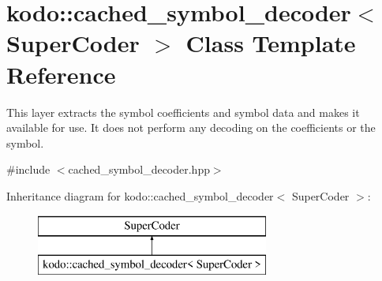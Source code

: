 \hypertarget{classkodo_1_1cached__symbol__decoder}{\section{kodo\-:\-:cached\-\_\-symbol\-\_\-decoder$<$ Super\-Coder $>$ Class Template Reference}
\label{classkodo_1_1cached__symbol__decoder}
}


This layer extracts the symbol coefficients and symbol data and makes it available for use. It does not perform any decoding on the coefficients or the symbol.  




{\ttfamily \#include $<$cached\-\_\-symbol\-\_\-decoder.\-hpp$>$}

Inheritance diagram for kodo\-:\-:cached\-\_\-symbol\-\_\-decoder$<$ Super\-Coder $>$\-:\begin{figure}[H]
\begin{center}
\leavevmode
\includegraphics[height=2.000000cm]{classkodo_1_1cached__symbol__decoder}
\end{center}
\end{figure}
